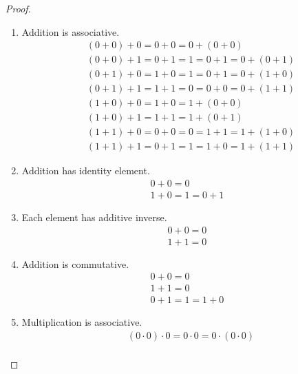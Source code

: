 \begin{proof}
    \begin{enumerate}[label = (\arabic*)]
        \item Addition is associative.
              \[
                  \begin{split}
                      &(0 + 0) + 0 = 0 + 0 = 0 + (0 + 0) \\
                      &(0 + 0) + 1 = 0 + 1 = 1 = 0 + 1 = 0 + (0 + 1) \\
                      &(0 + 1) + 0 = 1 + 0 = 1 = 0 + 1 = 0 + (1 + 0) \\
                      &(0 + 1) + 1 = 1 + 1 = 0 = 0 + 0 = 0 + (1 + 1) \\
                      &(1 + 0) + 0 = 1 + 0 = 1 + (0 + 0) \\
                      &(1 + 0) + 1 = 1 + 1 = 1 + (0 + 1) \\
                      &(1 + 1) + 0 = 0 + 0 = 0 = 1 + 1 = 1 + (1 + 0) \\
                      &(1 + 1) + 1 = 0 + 1 = 1 = 1 + 0 = 1 + (1 + 1)
                  \end{split}
              \]
        \item Addition has identity element.
              \[
                  \begin{split}
                      0 + 0 = 0 \\
                      1 + 0 = 1 = 0 + 1
                  \end{split}
              \]
        \item Each element has additive inverse.
              \[
                  \begin{split}
                      0 + 0 = 0 \\
                      1 + 1 = 0
                  \end{split}
              \]
        \item Addition is commutative.
              \[
                  \begin{split}
                      0 + 0 = 0 \\
                      1 + 1 = 0 \\
                      0 + 1 = 1 = 1 + 0
                  \end{split}
              \]
        \item Multiplication is associative.
              \[
                  \begin{split}
                      &(0 \cdot 0) \cdot 0 = 0 \cdot 0 = 0 \cdot (0 \cdot 0) \\

\end{split}\]
\end{enumerate}
\end{proof}
